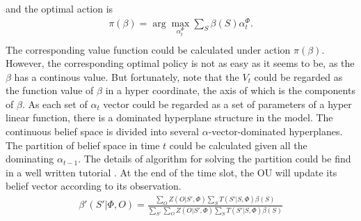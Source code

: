 \documentclass[conference]{IEEEtran}
\begin{document}
and the optimal action is
\begin{equation}
\begin{aligned}
	\pi\left(\beta\right) =
	\arg\underset{\alpha_t^\Phi}{\max}\sum\limits_{S}\beta\left(S\right)\alpha_t^\Phi.\\
\end{aligned}
\end{equation}
The corresponding value function could be calculated under action \(\pi\left(\beta\right)\).
However, the corresponding optimal policy is not as easy as it seems to be, as the \(\beta\) has a continous value.
But fortunately, note that the \(V_t\) could be regarded as the function value of \(\beta\) in a hyper coordinate,
the axis of which is the components of \(\beta\).
As each set of \(\alpha_t\) vector could be regarded as a set of parameters of a hyper linear function,
there is a dominated hyperplane structure in the model.
The continuous belief space is divided into several \(\alpha\)-vector-dominated hyperplanes.
The partition of belief space in time \(t\) could be calculated given all the dominating \(\alpha_{t-1}\).
The details of algorithm for solving the partition could be find in a well written tutorial \cite{pomdptool}.
At the end of the time slot, the OU will update its belief vector according to its observation.
\begin{align}
	\beta'\left(S'|\Phi, O\right) = \frac{\sum_{O}Z\left(O|S',\Phi\right)\sum_{S}
	T\left(S'|S,\Phi\right)\beta\left(S\right)}
	{\sum_{S'}\sum_{O}Z\left(O|S',\Phi\right)\sum_{S}T\left(S'|S,\Phi\right)\beta\left(S\right)}
\end{align}
\end{document}
